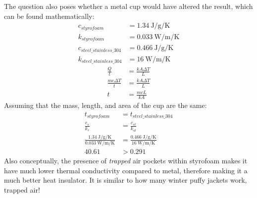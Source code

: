 \documentclass{article}
\begin{document}
The question also poses whether a metal cup would have altered the result, which can be found mathematically:
\begin{align*}
	c_{styrofoam} & = \SI{1.34}{\joule \per \gram \per \kelvin} \\
	k_{styrofoam} & = \SI{0.033}{\watt \per \meter \per \kelvin} \\
	c_{steel\_stainless\_304} & = \SI{0.466}{\joule \per \gram \per \kelvin} \\
	k_{steel\_stainless\_304} & = \SI{16}{\watt \per \meter \per \kelvin}
\end{align*}
\begin{align*}
	\frac{ Q }{ t } & = \frac{ kA\Delta T}{ L } \\
	\frac{ mc\Delta T }{ t } & = \frac{ kA\Delta T }{ L } \\
	t & = \frac{ mcL }{ kA }
\end{align*}
Assuming that the mass, length, and area of the cup are the same:
\begin{align*}
	t_{styrofoam} & = t_{steel\_stainless\_304} \\
	\frac{ c_{s} }{ k_{s} } & = \frac{ c_{st} }{ k_{st} } \\
	\frac{ \SI{1.34}{\joule \per \gram \per \kelvin} }{ \SI{0.033}{\watt \per \meter \per \kelvin} } & = \frac{ \SI{0.466}{\joule \per \gram \per \kelvin} }{ \SI{16}{\watt \per \meter \per \kelvin} } \\
	40.61 & > 0.291
\end{align*}
Also conceptually, the presence of \textit{trapped} air pockets within styrofoam makes it have much lower thermal conductivity compared to metal, therefore making it a much better heat insulator. It is similar to how many winter puffy jackets work, trapped air!
\end{document}
